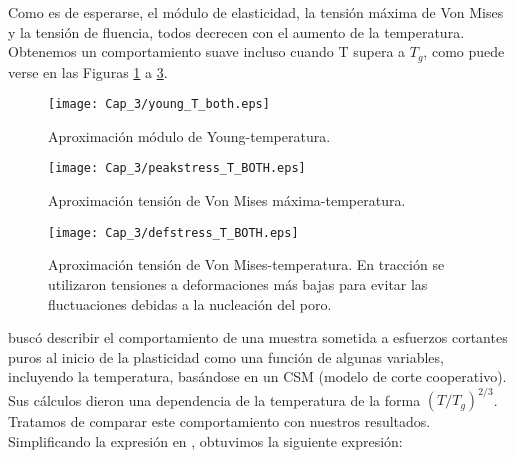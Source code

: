 Como es de esperarse, el módulo de elasticidad, la tensión máxima de Von Mises y la tensión de fluencia, todos decrecen con el aumento de la temperatura. Obtenemos un comportamiento suave incluso cuando T supera a $T_g$, como puede verse en las Figuras \ref{C3:fg:youngVsT} a \ref{C3:fg:peakVMises1218VsT}.


\begin{figure}[htp]
\centering
\texttt{[image: Cap\_3/young\_T\_both.eps]}
\caption[Aproximación módulo de Young-temperatura]{Aproximación módulo de Young-temperatura.}
\label{C3:fg:youngVsT}
\end{figure}

\begin{figure}[htp]
\centering
\texttt{[image: Cap\_3/peakstress\_T\_BOTH.eps]}
\caption[Aproximación tensión de Von Mises máxima-temperatura]{Aproximación tensión de Von Mises máxima-temperatura.}
\label{C3:fg:peakVMisesVsT}
\end{figure}

\begin{figure}[htp]
\centering
\texttt{[image: Cap\_3/defstress\_T\_BOTH.eps]}
\caption[Aproximación tensión de Von Mises-temperatura]{Aproximación tensión de Von Mises-temperatura. En tracción se utilizaron tensiones a deformaciones más bajas para evitar las fluctuaciones debidas a la nucleación del poro.}
\label{C3:fg:peakVMises1218VsT}
\end{figure} 

\cite{cheng11} buscó describir el comportamiento de una muestra sometida a esfuerzos cortantes puros al inicio de la plasticidad  como una función de algunas variables, incluyendo la temperatura, basándose en un CSM (modelo de corte cooperativo). Sus cálculos dieron una dependencia de la temperatura de la forma $(T/T_g)^{2/3}$. Tratamos de comparar este comportamiento con nuestros resultados. Simplificando la expresión en \cite{cheng11}, obtuvimos la siguiente expresión:


